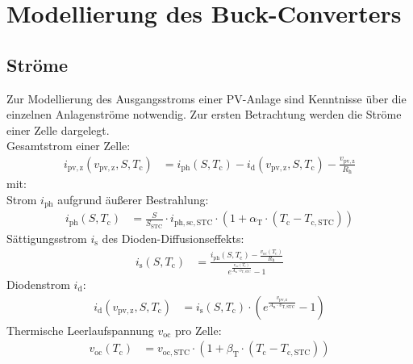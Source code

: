 \section{Modellierung des Buck-Converters}
\label{sec:Modellierung}
\subsection{Ströme}
\label{sec:Stroeme}
Zur Modellierung des Ausgangsstroms einer PV-Anlage sind Kenntnisse über die einzelnen Anlagenströme notwendig. Zur ersten Betrachtung werden die Ströme einer Zelle dargelegt.\\
\newline
Gesamtstrom einer Zelle:
\begin{align}
    i_{\mathrm{pv,z}}(v_{\mathrm{pv,z}}, S, T_{\mathrm{c}}) &= i_{\mathrm{ph}}(S, T_{\mathrm{c}}) - i_{\mathrm{d}}(v_{\mathrm{pv,z}}, S, T_{\mathrm{c}}) - \frac{v_{\mathrm{pv,z}}}{R_{\mathrm{h}}}
    \label{eq:Gleichung2}
\end{align}
\newline
mit:\\
\newline
Strom $i_{\mathrm{ph}}$ aufgrund äußerer Bestrahlung:
\begin{align*}
    i_{\mathrm{ph}}(S, T_{\mathrm{c}}) &= \frac{S}{S_{\mathrm{STC}}}\cdot i_{\mathrm{ph,sc,STC}}\cdot\left(1+\alpha_{\mathrm{T}}\cdot\left(T_{\mathrm{c}}-T_{\mathrm{c,STC}}\right)\right)
\end{align*}
\newline
Sättigungsstrom $i_{\mathrm{s}}$ des Dioden-Diffusionseffekts:
\begin{align*}
    i_{\mathrm{s}}(S, T_{\mathrm{c}}) &= \frac{i_{\mathrm{ph}}(S, T_{\mathrm{c}})-\frac{v_{\mathrm{oc}}(T_{\mathrm{c}})}{R_{\mathrm{h}}}}{e^{\frac{v_{\mathrm{oc}}(T_{\mathrm{c}})}{A_{\mathrm{n}}\cdot v_{\mathrm{T,STC}}}}-1}
\end{align*}
\newline
Diodenstrom $i_{\mathrm{d}}$:
\begin{align*}
    i_{\mathrm{d}}(v_{\mathrm{pv,z}}, S, T_{\mathrm{c}}) &= i_{\mathrm{s}}(S, T_{\mathrm{c}})\cdot \left(e^{\frac{v_{\mathrm{pv,z}}}{A_{\mathrm{n}}\cdot v_{\mathrm{T,STC}}}}-1\right)
\end{align*}
\newline
Thermische Leerlaufspannung $v_{\mathrm{oc}}$ pro Zelle:
\begin{align*}
    v_{\mathrm{oc}}(T_{\mathrm{c}}) &= v_{\mathrm{oc,STC}}\cdot\left(1+\beta_{\mathrm{T}}\cdot\left(T_{\mathrm{c}}-T_{\mathrm{c,STC}}\right)\right)
\end{align*}
